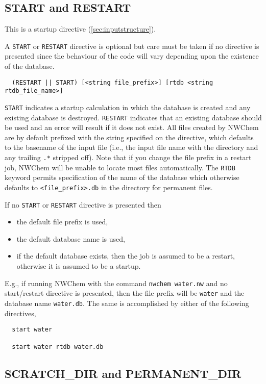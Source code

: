 
\subsection{START and RESTART}
\label{sec:start}

This is a startup directive (\ref{sec:inputstructure}).

A \verb+START+ or \verb+RESTART+ directive is optional but care must
be taken if no directive is presented since the behaviour of the code
will vary depending upon the existence of the database. 
\begin{verbatim}
  (RESTART || START) [<string file_prefix>] [rtdb <string rtdb_file_name>]
\end{verbatim}
\verb+START+ indicates a startup calculation in which the database is
created and any existing database is destroyed.  \verb+RESTART+
indicates that an existing database should be used and an error will
result if it does not exist.  All files created by NWChem are by
default prefixed with the string specified on the directive, which
defaults to the basename of the input file (i.e., the input file name
with the directory and any trailing \verb+.*+ stripped off).  Note
that if you change the file prefix in a restart job, NWChem will be
unable to locate most files automatically.  The \verb+RTDB+ keyword
permits specification of the name of the database which otherwise
defaults to \verb+<file_prefix>.db+ in the directory for permanent
files.

If no \verb+START+ or \verb+RESTART+ directive is presented then
\begin{itemize}
  \item the default file prefix is used,
  \item the default database name is used,
  \item if the default database exists, then the job is assumed to be
    a restart, otherwise it is assumed to be a startup.
\end{itemize}

E.g., if running NWChem with the command \verb+nwchem water.nw+ and no
start/restart directive is presented, then the file prefix will be
\verb+water+ and the database name \verb+water.db+.  The same is
accomplished by either of the following directives,
\begin{verbatim}
  start water

  start water rtdb water.db
\end{verbatim}

\subsection{SCRATCH\_DIR and PERMANENT\_DIR}
\label{sec:dirs}

